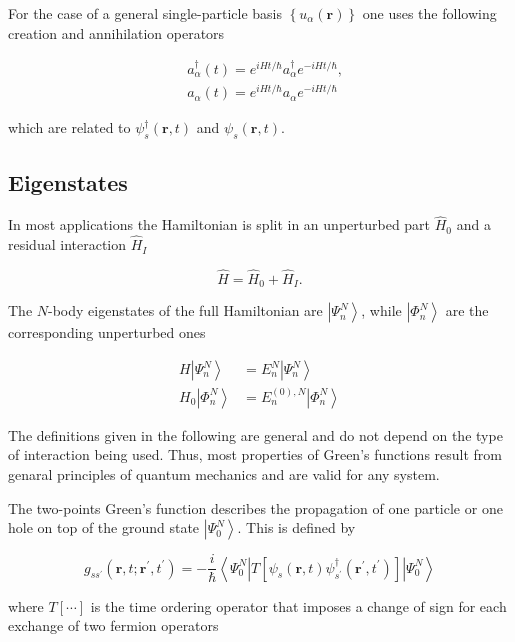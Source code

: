 For the case of a general single-particle basis
$\left\{u_{\alpha}(\mathbf{r})\right\}$ one uses the following
creation and annihilation operators

$$
\begin{aligned}
& a_{\alpha}^{\dagger}(t)=e^{i H t / \hbar} a_{\alpha}^{\dagger} e^{-i H t / \hbar}, \\
& a_{\alpha}(t)=e^{i H t / \hbar} a_{\alpha} e^{-i H t / \hbar}
\end{aligned}
$$

which are related to $\psi_{s}^{\dagger}(\mathbf{r}, t)$ and
$\psi_{s}(\mathbf{r}, t)$.

{
\subsection{Eigenstates}


  In most applications the Hamiltonian is split in an unperturbed part $\hat{H}_{0}$ and a residual interaction $\hat{H}_I$

$$
\hat{H}=\hat{H}_{0}+\hat{H}_I .
$$

The $N$-body eigenstates  of the full Hamiltonian are $\left|\Psi_{n}^{N}\right\rangle$, while $\left|\Phi_{n}^{N}\right\rangle$ are the corresponding unperturbed ones

$$
\begin{aligned}
H\left|\Psi_{n}^{N}\right\rangle & =E_{n}^{N}\left|\Psi_{n}^{N}\right\rangle \\
H_{0}\left|\Phi_{n}^{N}\right\rangle & =E_{n}^{(0), N}\left|\Phi_{n}^{N}\right\rangle
\end{aligned}
$$

The definitions given in the following are general and do not depend on the type of interaction being used. Thus, most properties of Green's functions result from genaral principles of quantum mechanics and are valid for any system.

The two-points Green's function describes the propagation of one particle or one hole on top of the ground state $\left|\Psi_{0}^{N}\right\rangle$. This is defined by

$$
g_{s s^{\prime}}\left(\mathbf{r}, t ; \mathbf{r}^{\prime}, t^{\prime}\right)=-\frac{i}{\hbar}\left\langle\Psi_{0}^{N}\left|T\left[\psi_{s}(\mathbf{r}, t) \psi_{s^{\prime}}^{\dagger}\left(\mathbf{r}^{\prime}, t^{\prime}\right)\right]\right| \Psi_{0}^{N}\right\rangle
$$

where $T[\cdots]$ is the time ordering operator that imposes a change of sign for each exchange of two fermion operators

}
